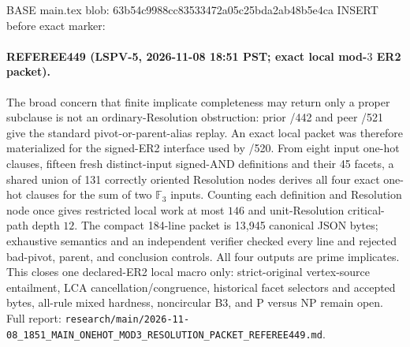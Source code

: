 BASE main.tex blob: 63b54c9988cc83533472a05c25bda2ab48b5e4ca
INSERT before exact marker: %

\paragraph{REFEREE449 (LSPV-5, 2026-11-08 18:51 PST; exact local mod-$3$ ER2 packet).}
The broad concern that finite implicate completeness may return only a proper
subclause is not an ordinary-Resolution obstruction: prior /442 and peer /521
give the standard pivot-or-parent-alias replay.  An exact local packet was
therefore materialized for the signed-ER2 interface used by /520.  From eight
input one-hot clauses, fifteen fresh distinct-input signed-AND definitions and
their 45 facets, a shared union of 131 correctly oriented Resolution nodes
derives all four exact one-hot clauses for the sum of two $\mathbb F_3$ inputs.
Counting each definition and Resolution node once gives restricted local work
at most $146$ and unit-Resolution critical-path depth $12$.  The compact
184-line packet is 13,945 canonical JSON bytes; exhaustive semantics and an
independent verifier checked every line and rejected bad-pivot, parent, and
conclusion controls.  All four outputs are prime implicates.  This closes one
declared-ER2 local macro only: strict-original vertex-source entailment, LCA
cancellation/congruence, historical facet selectors and accepted bytes,
all-rule mixed hardness, noncircular B3, and P versus NP remain open.  Full
report:
\texttt{research/main/2026-11-08\_1851\_MAIN\_ONEHOT\_MOD3\_RESOLUTION\_PACKET\_REFEREE449.md}.
